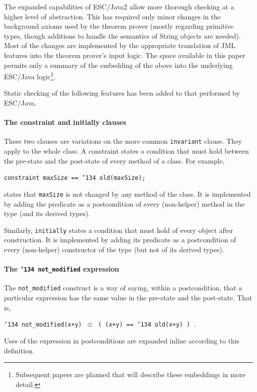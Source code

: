 \documentclass{llncs}
\begin{document}
The expanded capabilities of ESC/Java2 allow more thorough checking at a
higher level of abstraction.  This has required only minor changes in the background
axioms used by the theorem prover (mostly regarding primitive types, though additions
to handle the semantics of String objects are needed).  Most of the changes are implemented
by the appropriate translation of JML features into the theorem prover's input logic.
The space available in this paper permits only
a summary of the embedding of the above into the underlying ESC/Java
logic\footnote{Subsequent papers are planned that will describe these
  embeddings in more detail.}.  

Static checking of the following features has been added to that
performed by ESC/Java.  


\paragraph*{The constraint and initially clauses}
These two clauses are variations on the more common \texttt{invariant}
clause.  They apply to the whole class.  A constraint states a
condition that must hold between the pre-state and the post-state of
every method of a class.  For example,
\begin{center}
\texttt{constraint maxSize == \char'134 old(maxSize); }
\end{center}
states that \texttt{maxSize} is not changed by any method of the
class.  It is implemented by adding the predicate as a postcondition
of every (non-helper) method in the type (and its derived types).

Similarly, \texttt{initially} states a condition that must hold of
every object after construction.  It is implemented by adding its
predicate as a postcondition of every (non-helper) constructor of the
type (but not of its derived types).

\paragraph*{The \texttt{\char'134 not\_modified} expression}
The \texttt{not\_modified} construct is a way of saying, within a
postcondition, that a particular expression has the same value in the
pre-state and the post-state.  That is,
\begin{center}
\texttt{\char'134 not\_modified(x+y) $\equiv$ ( (x+y) == \char'134 old(x+y) )  }.
\end{center}
Uses of the expression in postconditions are expanded inline according
to this definition.
\end{document}
